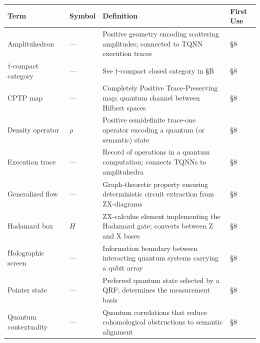 \documentclass[
]{article}
\newcounter{none} %
\numberwithin{equation}{section}
\begin{document}
{\def\LTcaptype{none} %
\begin{longtable}[]{@{}
  >{\raggedright\arraybackslash}p{}
  >{\centering\arraybackslash}p{}
  >{\raggedright\arraybackslash}p{}
  >{\centering\arraybackslash}p{}@{}}
\toprule\noalign{}
\begin{minipage}[b]{\linewidth}\raggedright
Term
\end{minipage} & \begin{minipage}[b]{\linewidth}\centering
Symbol
\end{minipage} & \begin{minipage}[b]{\linewidth}\raggedright
Definition
\end{minipage} & \begin{minipage}[b]{\linewidth}\centering
First Use
\end{minipage} \\
\midrule\noalign{}
\endhead
\bottomrule\noalign{}
\endlastfoot
Amplituhedron & --- & Positive geometry encoding scattering amplitudes;
connected to TQNN execution traces & §8 \\
\(\dagger\)-compact category & --- & See \(\dagger\)-compact closed
category in §B & §8 \\
CPTP map & --- & Completely Positive Trace-Preserving map; quantum
channel between Hilbert spaces & §8 \\
Density operator & \(\rho\) & Positive semidefinite trace-one operator
encoding a quantum (or semantic) state & §8 \\
Execution trace & --- & Record of operations in a quantum computation;
connects TQNNs to amplituhedra & §8 \\
Generalized flow & --- & Graph-theoretic property ensuring deterministic
circuit extraction from ZX-diagrams & §8 \\
Hadamard box & \(H\) & ZX-calculus element implementing the Hadamard
gate; converts between Z and X bases & §8 \\
Holographic screen & --- & Information boundary between interacting
quantum systems carrying a qubit array & §8 \\
Pointer state & --- & Preferred quantum state selected by a QRF;
determines the measurement basis & §8 \\
Quantum contextuality & --- & Quantum correlations that reduce
cohomological obstructions to semantic alignment & §8 \\

\end{longtable}}
\end{document}

